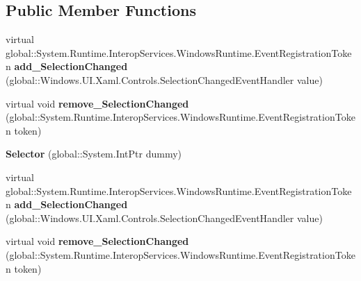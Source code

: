 \subsection*{Public Member Functions}
\begin{DoxyCompactItemize}
\item 
\mbox{\label{class_windows_1_1_u_i_1_1_xaml_1_1_controls_1_1_primitives_1_1_selector_acd38c72f1d74ff86e39e3835f768b1b2}} 
virtual global\+::\+System.\+Runtime.\+Interop\+Services.\+Windows\+Runtime.\+Event\+Registration\+Token {\bfseries add\+\_\+\+Selection\+Changed} (global\+::\+Windows.\+U\+I.\+Xaml.\+Controls.\+Selection\+Changed\+Event\+Handler value)
\item 
\mbox{\label{class_windows_1_1_u_i_1_1_xaml_1_1_controls_1_1_primitives_1_1_selector_a2fc343b1044baa49806a7da0df01d46e}} 
virtual void {\bfseries remove\+\_\+\+Selection\+Changed} (global\+::\+System.\+Runtime.\+Interop\+Services.\+Windows\+Runtime.\+Event\+Registration\+Token token)
\item 
\mbox{\label{class_windows_1_1_u_i_1_1_xaml_1_1_controls_1_1_primitives_1_1_selector_a4c0671da6b9b2fce8192909e4d622777}} 
{\bfseries Selector} (global\+::\+System.\+Int\+Ptr dummy)
\item 
\mbox{\label{class_windows_1_1_u_i_1_1_xaml_1_1_controls_1_1_primitives_1_1_selector_acd38c72f1d74ff86e39e3835f768b1b2}} 
virtual global\+::\+System.\+Runtime.\+Interop\+Services.\+Windows\+Runtime.\+Event\+Registration\+Token {\bfseries add\+\_\+\+Selection\+Changed} (global\+::\+Windows.\+U\+I.\+Xaml.\+Controls.\+Selection\+Changed\+Event\+Handler value)
\item 
\mbox{\label{class_windows_1_1_u_i_1_1_xaml_1_1_controls_1_1_primitives_1_1_selector_a2fc343b1044baa49806a7da0df01d46e}} 
virtual void {\bfseries remove\+\_\+\+Selection\+Changed} (global\+::\+System.\+Runtime.\+Interop\+Services.\+Windows\+Runtime.\+Event\+Registration\+Token token)
\item 

\end{DoxyCompactItemize}
